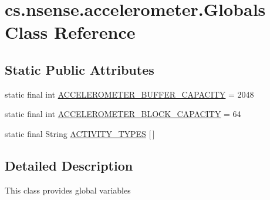 \hypertarget{classcs_1_1nsense_1_1accelerometer_1_1_globals}{\section{cs.\-nsense.\-accelerometer.\-Globals Class Reference}
\label{classcs_1_1nsense_1_1accelerometer_1_1_globals}
}
\subsection*{Static Public Attributes}
\begin{DoxyCompactItemize}
\item 
static final int \hyperlink{classcs_1_1nsense_1_1accelerometer_1_1_globals_a0062d803d180c5b013767ab503b06e58}{A\-C\-C\-E\-L\-E\-R\-O\-M\-E\-T\-E\-R\-\_\-\-B\-U\-F\-F\-E\-R\-\_\-\-C\-A\-P\-A\-C\-I\-T\-Y} = 2048
\item 
static final int \hyperlink{classcs_1_1nsense_1_1accelerometer_1_1_globals_ad31d7bf00449ff1d71f35e43f54759aa}{A\-C\-C\-E\-L\-E\-R\-O\-M\-E\-T\-E\-R\-\_\-\-B\-L\-O\-C\-K\-\_\-\-C\-A\-P\-A\-C\-I\-T\-Y} = 64
\item 
static final String \hyperlink{classcs_1_1nsense_1_1accelerometer_1_1_globals_ac5af2c0258497b76a55fc1685c450362}{A\-C\-T\-I\-V\-I\-T\-Y\-\_\-\-T\-Y\-P\-E\-S} \mbox{[}$\,$\mbox{]}
\end{DoxyCompactItemize}


\subsection{Detailed Description}
This class provides global variables 


